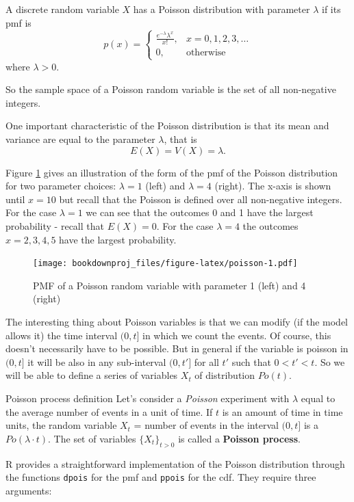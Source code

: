 \documentclass[
]{book}
\theoremstyle{definition}
\theoremstyle{definition}
\theoremstyle{definition}
\theoremstyle{definition}
\theoremstyle{remark}
\begin{document}
A discrete random variable \(X\) has a Poisson distribution with parameter \(\lambda\) if its pmf is
\[
p(x)=\left\{
\begin{array}{ll}
\frac{e^{-\lambda}\lambda^x}{x!}, & x = 0,1,2,3,\dots\\
0, & \mbox{otherwise}
\end{array}
\right.
\]
where \(\lambda > 0\).

So the sample space of a Poisson random variable is the set of all non-negative integers.

One important characteristic of the Poisson distribution is that its mean and variance are equal to the parameter \(\lambda\), that is
\[
E(X)= V(X) = \lambda.
\]

Figure \ref{fig:poisson} gives an illustration of the form of the pmf of the Poisson distribution for two parameter choices: \(\lambda=1\) (left) and \(\lambda = 4\) (right). The x-axis is shown until \(x=10\) but recall that the Poisson is defined over all non-negative integers. For the case \(\lambda=1\) we can see that the outcomes 0 and 1 have the largest probability - recall that \(E(X)=0\). For the case \(\lambda = 4\) the outcomes \(x = 2,3,4,5\) have the largest probability.

\begin{figure}
\centering
\texttt{[image: bookdownproj\_files/figure-latex/poisson-1.pdf]}
\caption{\label{fig:poisson}PMF of a Poisson random variable with parameter 1 (left) and 4 (right)}
\end{figure}

The interesting thing about Poisson variables is that we can modify (if the model allows it) the time interval \((0,t]\) in which we count the events. Of course, this doesn't necessarily have to be possible. But in general if the variable is poisson in \((0,t]\) it will be also in any sub-interval \((0,t']\) for all \(t'\) such that \(0<t'<t\). So we will be able to define a series of variables \(X_t\) of distribution \(Po(t)\).

Poisson process definition Let's consider a \emph{Poisson} experiment with \(\lambda\) equal to the average number of events in a unit of time. If \(t\) is an amount of time in time units, the random variable \(X_{t}\) = number of events in the interval \((0,t]\) is a \(Po(\lambda\cdot t)\). The set of variables \(\{X_t\}_{t>0}\) is called a \textbf{Poisson process}.

R provides a straightforward implementation of the Poisson distribution through the functions \texttt{dpois} for the pmf and \texttt{ppois} for the cdf. They require three arguments:
\end{document}
